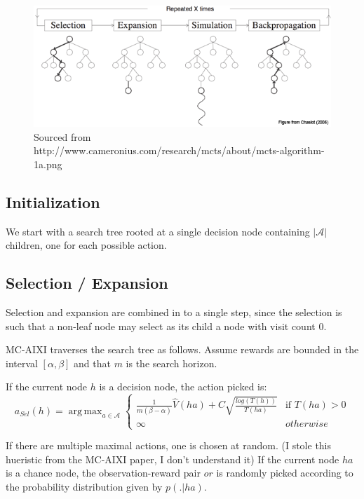 \documentclass[12pt,a4paper,twoside]{article}
\theoremstyle{upright}
\newcommand{\blankpage}{\mbox{} \newpage }
\DeclareMathOperator*{\argmax}{arg\,max}
\begin{document}
\begin{figure}
\centering
\includegraphics[scale=0.5]{mcts.png}
\caption{Sourced from http://www.cameronius.com/research/mcts/about/mcts-algorithm-1a.png}
\label{mcts}
\end{figure}


\blankpage


\subsection{Initialization}
We start with a search tree rooted at a single decision node containing $|\mathscr{A}|$ children,
one for each possible action.
\subsection{Selection / Expansion}

Selection and expansion are combined in to a single step, since the selection is such that a non-leaf node may select as its child a node with visit count 0.

MC-AIXI traverses the search tree as follows.
Assume rewards are bounded in the interval $[\alpha, \beta]$ and that $m$ is the search horizon. 

If the current node $h$ is a decision node, the action picked is:
\begin{equation}
a_{Sel}(h) = \argmax_{a \in \mathscr{A}} 
\begin{cases} \frac{1}{m(\beta-\alpha)} \hat V (ha) + C \sqrt{\frac{log(T(h))}{T(ha)}}& \mbox{if } T(ha) > 0
\\ \infty & otherwise
 \end{cases}
\end{equation}

If there are multiple maximal actions, one is chosen at random.
(I stole this hueristic from the MC-AIXI paper, I don't understand it)
If the current node $ha$ is a chance node, the observation-reward pair $or$ 
is randomly picked according to the probability distribution given by $p(.|ha)$.
\end{document}
